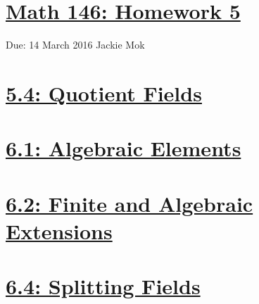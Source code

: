 \documentclass{article}
\begin{document}
\section*{\underline{Math 146: Homework 5}}
Due: 14 March 2016
\newline Jackie Mok

\vspace{10 mm}

\section*{\underline{5.4: Quotient Fields}}


\section*{\underline{6.1: Algebraic Elements}}






\section*{\underline{6.2: Finite and Algebraic Extensions }}






\section*{\underline{6.4: Splitting Fields}}


\end{document}
